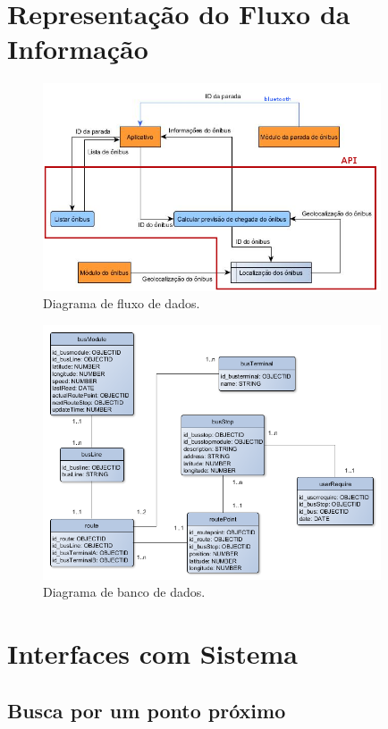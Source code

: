 \documentclass[
	12pt,				%
	oneside,			%
	a4paper,			%
	brazil				%
]{abntex2}
\begin{document}
\newpage

\section{Representação do Fluxo da Informação}

\begin{figure}[!h]
\centering
\includegraphics[width=10cm, center]{images/data-flux.png}
\caption{Diagrama de fluxo de dados.}
\label{Rotulo}
\end{figure}

\begin{figure}[!h]
\centering
\includegraphics[width=10cm, center]{images/database-api.png}
\caption{Diagrama de banco de dados.}
\label{Rotulo}
\end{figure}

\newpage

\section{Interfaces com Sistema}

\subsection{Busca por um ponto próximo}
\end{document}
